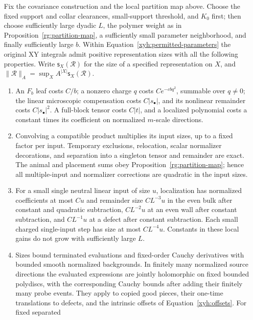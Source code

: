 \begin{proposition}\label{xyh:calculus}
Fix the covariance construction and the local partition map above.
Choose the fixed support and collar clearances, small-support threshold,
and $K_0$ first; then choose sufficiently large dyadic $L$, the polymer
weight as in Proposition~\ref{rg:partition-map}, a sufficiently small
parameter neighborhood, and finally sufficiently large $b$. Within
Equation~\eqref{xyh:permitted-parameters} the original XY integrals admit
positive representation sizes with all the following properties. Write
$\mathsf s_X(\mathcal R)$ for the size of a specified representation on
$X$, and $\|\mathcal R\|_A=\sup_X A^{|X|}\mathsf s_X(\mathcal R)$.
\begin{enumerate}[label=\textup{(\roman*)}]
\item An $F_b$ leaf costs $C/b$; a nonzero charge $q$ costs
$C e^{-cbq^2}$, summable over $q\ne0$; the linear microscopic
compensation costs $C|s_\bullet|$, and its nonlinear remainder costs
$C|s_\bullet|^2$. A full-block tensor costs $C|t|$, and a localized
polynomial costs a constant times its coefficient on normalized
$m$-scale directions.
\item Convolving a compatible product multiplies its input sizes, up to
a fixed factor per input. Temporary exclusions, relocation, scalar
normalizer decorations, and separation into a singleton tensor and
remainder are exact. The animal and placement sums obey
Proposition~\ref{rg:partition-map}; hence all multiple-input and
normalizer corrections are quadratic in the input sizes.
\item For a small single neutral linear input of size $u$, localization
has normalized coefficients at most $Cu$ and remainder size
$CL^{-3}u$ in the even bulk after constant and quadratic subtraction,
$CL^{-2}u$ at an even wall after constant subtraction, and $CL^{-1}u$
at a defect after constant subtraction. Each small charged single-input
step has size at most $CL^{-4}u$. Constants in these local gains do not
grow with sufficiently large $L$.
\item Sizes bound terminated evaluations and fixed-order Cauchy
derivatives with bounded smooth normalized backgrounds. In finitely many
normalized source directions the evaluated expressions are jointly
holomorphic on fixed bounded polydiscs, with the corresponding Cauchy
bounds after adding their finitely many probe events. They apply to
copied good pieces, their one-time translations to defects, and the
intrinsic offsets of Equation~\eqref{xyh:offsets}. For fixed separated

\end{enumerate}
\end{proposition}
